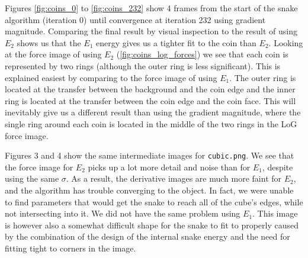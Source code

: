\documentclass[11pt,a4paper]{article}
\begin{document}
Figures \ref{fig:coins_0} to \ref{fig:coins_232} show 4 frames from the start
of the snake algorithm (iteration 0) until convergence at iteration 232 using
gradient magnitude. Comparing the final result by visual inspection to the
result of using $E_2$ shows us that the $E_1$ energy gives us a tighter fit to
the coin than $E_2$. Looking at the force image of using $E_2$
(\ref{fig:coins_log_forces}) we see that each coin is represented by two rings
(although the outer ring is less significant). This is explained easiest by
comparing to the force image of using $E_1$. The outer ring is located at
the transfer between the background and the coin edge and the inner ring is
located at the transfer between the coin edge and the coin face. This will
inevitably give us a different result than using the gradient magnitude, where
the single ring around each coin is located in the middle of the two rings in
the LoG force image.

Figures 3 and 4 show the same intermediate images for \texttt{cubic.png}. We
see that the force image for $E_2$ picks up a lot more detail and noise than
for $E_1$, despite using the same $\sigma$. As a result, the derivative images
are much more faint for $E_2$, and the algorithm has trouble converging to the
object. In fact, we were unable to find parameters that would get the snake to
reach all of the cube's edges, while not intersecting into it. We did not have
the same problem using $E_1$. This image is however also a somewhat difficult
shape for the snake to fit to properly caused by the combination of the design
of the internal snake energy and the need for fitting tight to corners in the
image.
\end{document}
